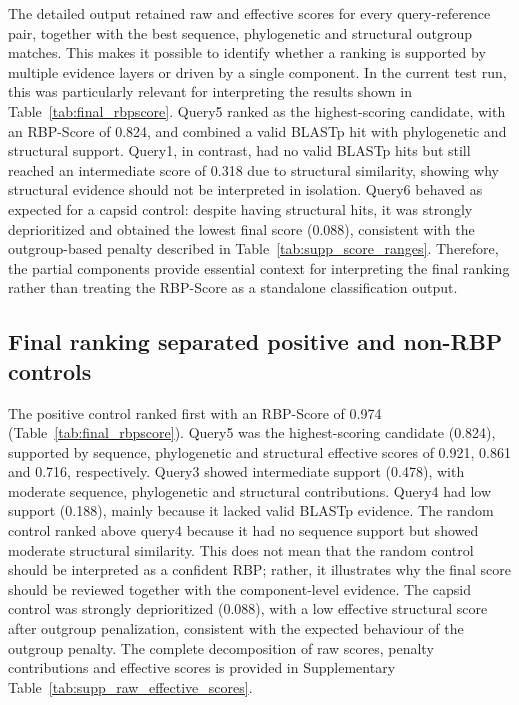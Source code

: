 \documentclass[runningheads]{llncs}
\begin{document}
The detailed output retained raw and effective scores for every query-reference pair, together with the best sequence, phylogenetic and structural outgroup matches. This makes it possible to identify whether a ranking is supported by multiple evidence layers or driven by a single component. In the current test run, this was particularly relevant for interpreting the results shown in Table~\ref{tab:final_rbpscore}. Query5 ranked as the highest-scoring candidate, with an RBP-Score of 0.824, and combined a valid BLASTp hit with phylogenetic and structural support. Query1, in contrast, had no valid BLASTp hits but still reached an intermediate score of 0.318 due to structural similarity, showing why structural evidence should not be interpreted in isolation. Query6 behaved as expected for a capsid control: despite having structural hits, it was strongly deprioritized and obtained the lowest final score (0.088), consistent with the outgroup-based penalty described in Table~\ref{tab:supp_score_ranges}. Therefore, the partial components provide essential context for interpreting the final ranking rather than treating the RBP-Score as a standalone classification output.

\subsection{Final ranking separated positive and non-RBP controls}

The positive control ranked first with an RBP-Score of 0.974 (Table~\ref{tab:final_rbpscore}). Query5 was the highest-scoring candidate (0.824), supported by sequence, phylogenetic and structural effective scores of 0.921, 0.861 and 0.716, respectively. Query3 showed intermediate support (0.478), with moderate sequence, phylogenetic and structural contributions. Query4 had low support (0.188), mainly because it lacked valid BLASTp evidence. The random control ranked above query4 because it had no sequence support but showed moderate structural similarity. This does not mean that the random control should be interpreted as a confident RBP; rather, it illustrates why the final score should be reviewed together with the component-level evidence. The capsid control was strongly deprioritized (0.088), with a low effective structural score after outgroup penalization, consistent with the expected behaviour of the outgroup penalty. The complete decomposition of raw scores, penalty contributions and effective scores is provided in Supplementary Table~\ref{tab:supp_raw_effective_scores}.
\end{document}
